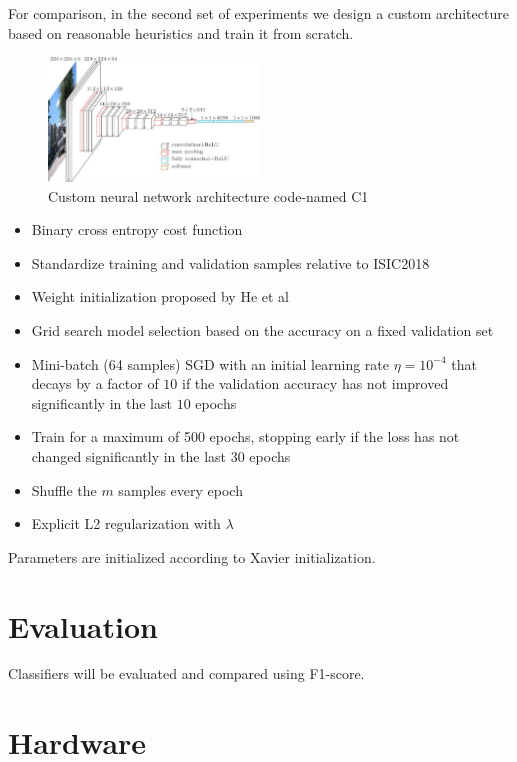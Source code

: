 For comparison, in the second set of experiments we design a custom architecture based on reasonable heuristics and train it from scratch.

\begin{figure}[h]
    \centering
    \includegraphics[width=0.5\textwidth]{figs/vgg16.jpg}
    \caption{Custom neural network architecture code-named C1}
    \label{fig:c1}
\end{figure}

\begin{itemize}
    \item Binary cross entropy cost function
    \item Standardize training and validation samples relative to ISIC2018
    \item Weight initialization proposed by He et al \cite{HeWeightInit}
    \item Grid search model selection based on the accuracy on a fixed validation set
    \item Mini-batch (64 samples) \ac{SGD} with an initial learning rate $\eta = 10^{-4}$ that decays by a factor of $10$ if the validation accuracy has not improved significantly in the last $10$ epochs
    \item Train for a maximum of 500 epochs, stopping early if the loss has not changed significantly in the last $30$ epochs
    \item Shuffle the $m$ samples every epoch
    \item Explicit L2 regularization with $\lambda$
\end{itemize}

Parameters are initialized according to Xavier initialization\cite{xavierinit}.

\section{Evaluation}

Classifiers will be evaluated and compared using F1-score.

\section{Hardware}

